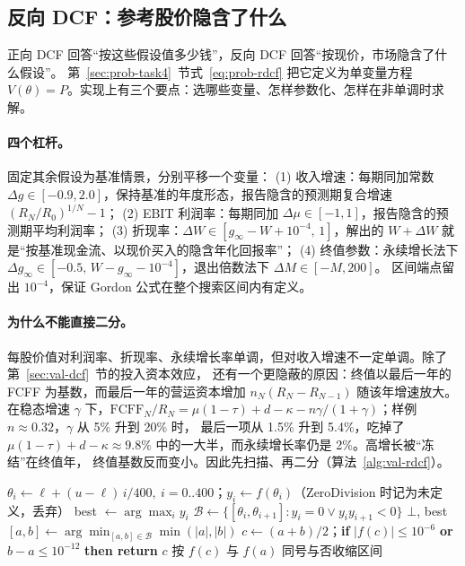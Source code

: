 \subsection{反向 DCF：参考股价隐含了什么}
\label{sec:val-reverse}

正向 DCF 回答“按这些假设值多少钱”，反向 DCF 回答“按现价，市场隐含了什么假设”\cite{rappaport2001expectations}。
第~\ref{sec:prob-task4}~节式~\eqref{eq:prob-rdcf} 把它定义为单变量方程 $V(\theta)=P$。实现上有三个要点：选哪些变量、怎样参数化、怎样在非单调时求解。

\paragraph{四个杠杆。} 固定其余假设为基准情景，分别平移一个变量：
(1) 收入增速：每期同加常数 $\Delta g\in[-0.9,2.0]$，保持基准的年度形态，报告隐含的预测期复合增速 $(R_N/R_0)^{1/N}-1$；
(2) EBIT 利润率：每期同加 $\Delta\mu\in[-1,1]$，报告隐含的预测期平均利润率；
(3) 折现率：$\Delta W\in[g_\infty-W+10^{-4},\,1]$，解出的 $W+\Delta W$ 就是“按基准现金流、以现价买入的隐含年化回报率”；
(4) 终值参数：永续增长法下 $\Delta g_\infty\in[-0.5,\,W-g_\infty-10^{-4}]$，退出倍数法下 $\Delta M\in[-M,200]$。
区间端点留出 $10^{-4}$，保证 Gordon 公式在整个搜索区间内有定义。

\paragraph{为什么不能直接二分。} 每股价值对利润率、折现率、永续增长率单调，但对收入增速不一定单调。除了第~\ref{sec:val-dcf}~节的投入资本效应，
还有一个更隐蔽的原因：终值以最后一年的 FCFF 为基数，而最后一年的营运资本增加 $n_N(R_N-R_{N-1})$ 随该年增速放大。
在稳态增速 $\gamma$ 下，$\text{FCFF}_N/R_N=\mu(1-\tau)+d-\kappa-n\gamma/(1+\gamma)$；样例 $n\approx0.32$，$\gamma$ 从 5\% 升到 20\% 时，
最后一项从 1.5\% 升到 5.4\%，吃掉了 $\mu(1-\tau)+d-\kappa\approx9.8\%$ 中的一大半，而永续增长率仍是 2\%。高增长被“冻结”在终值年，
终值基数反而变小。因此先扫描、再二分（算法~\ref{alg:val-rdcf}）。

\begin{algorithm}[t]
\caption{单变量反向 DCF（）}
\label{alg:val-rdcf}
\begin{algorithmic}[1]
  \State $\theta_i\gets \ell+(u-\ell)\,i/400,\ i=0..400$；$y_i\gets f(\theta_i)$（ZeroDivision 时记为未定义，丢弃）
  \State best $\gets\arg\max_i y_i$ 
  \State $\mathcal{B}\gets\{[\theta_i,\theta_{i+1}] : y_i=0 \lor y_iy_{i+1}<0\}$
   \State \Return $\bot$, best \EndIf
  \State $[a,b]\gets\arg\min_{[a,b]\in\mathcal{B}}\min(|a|,|b|)$ 
   
    \State $c\gets(a+b)/2$；\textbf{if} $|f(c)|\le10^{-6}$ \textbf{or} $b-a\le10^{-12}$ \textbf{then return} $c$
    \State 按 $f(c)$ 与 $f(a)$ 同号与否收缩区间
  \EndFor
\EndFunction
\end{algorithmic}
\end{algorithm}

